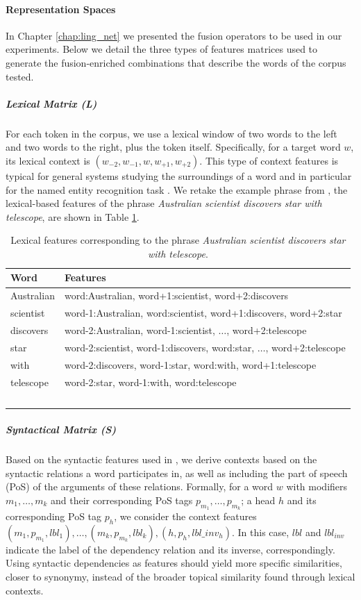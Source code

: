 \paragraph{Representation Spaces}\label{sec:rep_spaces}
In  Chapter \ref{chap:ling_net} we presented the fusion operators to be used in our experiments. Below we detail the three types of features matrices used to generate the fusion-enriched combinations that describe the words of the corpus tested.
\subparagraph{Lexical Matrix (L)}
For each token in the corpus, we use a lexical window of two words to the left and two words to the right, plus the token itself. Specifically, for a target word $w$, its lexical context is $(w_{-2}, w_{-1}, w, w_{+1}, w_{+2})$. This type of context features is typical for general systems studying the surroundings of a word and in particular for the named entity recognition task \cite{Daume2006,Nothman2009,RatinovR09}. 
 We retake the example phrase from \cite{LevyG14}, the lexical-based features of the phrase \textit{Australian scientist discovers star with telescope}, are shown in Table \ref{tab:lex-contextos}.
 
\begin{table}[ht]
\centering
\begin{tabular}{ll}
\hline 
 \textbf{Word} & \textbf{Features} \\ 
\hline 
Australian & word:Australian, word+1:scientist, word+2:discovers\\ 
scientist  &  word-1:Australian, word:scientist, word+1:discovers, word+2:star\\ 
discovers & word-2:Australian, word-1:scientist, $\dots$, word+2:telescope \\ 
star & word-2:scientist, word-1:discovers, word:star, $\dots$, word+2:telescope \\ 
with & word-2:discovers, word-1:star, word:with, word+1:telescope \\ 
telescope  &  word-2:star, word-1:with, word:telescope \\ 
\hline \
\end{tabular} 

\caption{Lexical features corresponding to the phrase \textit{Australian scientist discovers star with telescope}.}
\label{tab:lex-contextos}
\end{table} 

\subparagraph{Syntactical Matrix (S)}
Based on the syntactic features used in   \cite{LevyG14,Panchenko2017}, we derive contexts based on the syntactic relations a word participates in, as well as including the part of speech (PoS) of the arguments of these relations. Formally, for a word $w$ with modifiers $m_1, \dots, m_k$ and their corresponding PoS tags $p_{m_1}, \dots, p_{m_k}$; a head $h$ and its corresponding PoS tag $p_h$, we consider the context features $(m_1, p_{m_1}, lbl_1), \dots, \allowbreak (m_k, p_{m_k}, lbl_k), \allowbreak (h,p_h,lbl\_inv_h)$. In this case, $lbl$ and $lbl_{inv}$ indicate the label of the dependency relation and its inverse, correspondingly. Using syntactic dependencies as features should yield more specific similarities, closer to synonymy, instead of the broader topical similarity found through lexical contexts.

